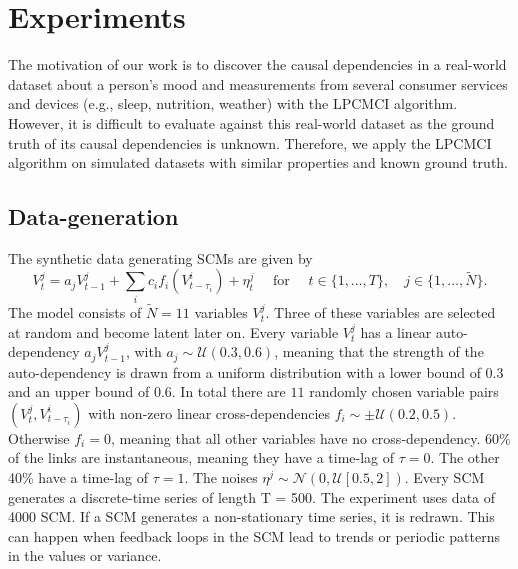 \documentclass[conference]{IEEEtran}
\begin{document}


\section{Experiments}
The motivation of our work is to discover the causal dependencies in a real-world dataset about a person's mood and measurements from several consumer services and devices (e.g., sleep, nutrition, weather)\cite{reiser_predicting_2022} with the LPCMCI algorithm. 
However, it is difficult to evaluate against this real-world dataset as the ground truth of its causal dependencies is unknown. Therefore, we apply the LPCMCI algorithm on simulated datasets with similar properties and known ground truth.

\subsection{Data-generation}
The synthetic data generating SCMs are given by
\begin{equation}
V_{t}^{j}=a_{j} V_{t-1}^{j}+\sum_{i} c_{i} f_{i}\left(V_{t-\tau_{i}}^{i}\right)+\eta_{t}^{j} \quad \text { for } \quad t \in\{1, \ldots, T\}, \quad j \in\{1, \ldots, \tilde{N} \}.
\end{equation}
The model consists of $\tilde{N}=11$ variables $V_t^j$. Three of these variables are selected at random and become latent later on.
Every variable $V_t^j$ has a linear auto-dependency $a_j V_{t-1}^{j}$, with $a_j \sim \mathcal{U}(0.3,0.6)$, meaning that the strength of the auto-dependency is drawn from a uniform distribution with a lower bound of 0.3 and an upper bound of 0.6.
In total there are $11$ randomly chosen variable pairs $(V_t^j,V^i_{t-\tau_i})$ with non-zero linear cross-dependencies $f_i \sim \pm \mathcal{U}(0.2,0.5)$. Otherwise $f_i=0$, meaning that all other variables have no cross-dependency.
60\% of the links are instantaneous, meaning they have a time-lag of $\tau =0$. The other 40\% have a time-lag of $\tau=1$.
The noises $\eta^{j} \sim \mathcal{N}(0,\mathcal{U}[0.5,2])$.
Every SCM generates a discrete-time series of length T = 500. The experiment uses data of 4000 SCM. If a SCM generates a non-stationary time series, it is redrawn. This can happen when feedback loops in the SCM lead to trends or periodic patterns in the values or variance.
\end{document}
